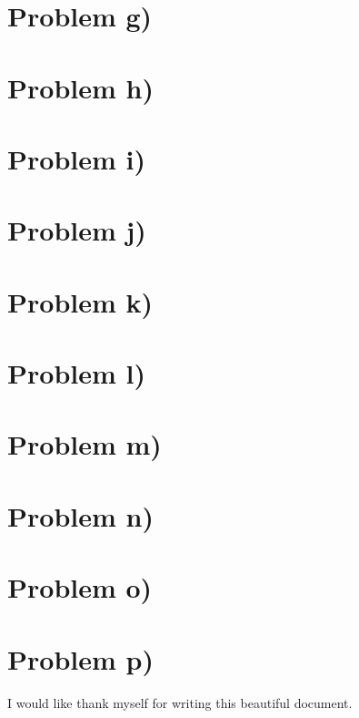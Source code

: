 \documentclass[reprint,english,notitlepage]{revtex4-1}  %
\numberwithin{equation}{section}
\begin{document}
\section{Problem g)}
\section{Problem h)}
\section{Problem i)}
\section{Problem j)}
\section{Problem k)}
\section{Problem l)}
\section{Problem m)}
\section{Problem n)}
\section{Problem o)}
\section{Problem p)}


\begin{acknowledgments}  %
I would like thank myself for writing this beautiful document.
\end{acknowledgments}
\end{document}
